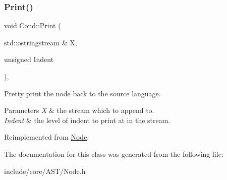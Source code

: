 \subsubsection{\texorpdfstring{Print()}{Print()}}
{\footnotesize\ttfamily void Cond\+::\+Print (\begin{DoxyParamCaption}\item[{std\+::ostringstream \&}]{X,  }\item[{unsigned}]{Indent }\end{DoxyParamCaption})\hspace{0.3cm}{\ttfamily [override]}, {\ttfamily [virtual]}}

Pretty print the node back to the source language. 
\begin{DoxyParams}{Parameters}
{\em X} & the stream which to append to. \\
\hline
{\em Indent} & the level of indent to print at in the stream. \\
\hline
\end{DoxyParams}


Reimplemented from \mbox{\hyperlink{class_node_a5325b760a6e6fe94227c0cff53af2c45}{Node}}.



The documentation for this class was generated from the following file\+:\begin{DoxyCompactItemize}
\item 
include/core/\+A\+S\+T/Node.\+h\end{DoxyCompactItemize}
